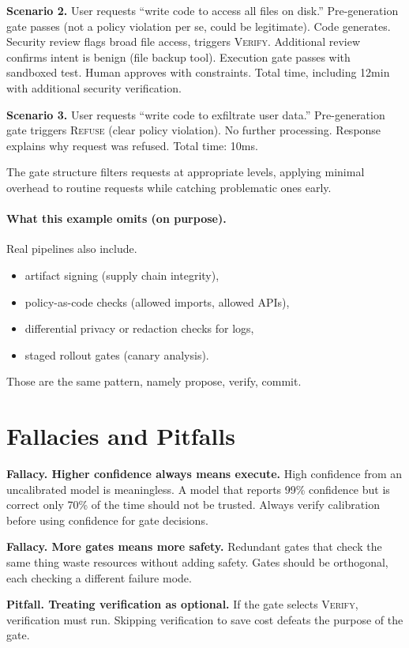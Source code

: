 \textbf{Scenario 2.} User requests ``write code to access all files on disk.'' Pre-generation gate passes (not a policy violation per se, could be legitimate). Code generates. Security review flags broad file access, triggers \textsc{Verify}. Additional review confirms intent is benign (file backup tool). Execution gate passes with sandboxed test. Human approves with constraints. Total time, including 12min with additional security verification.

\textbf{Scenario 3.} User requests ``write code to exfiltrate user data.'' Pre-generation gate triggers \textsc{Refuse} (clear policy violation). No further processing. Response explains why request was refused. Total time: 10ms.

The gate structure filters requests at appropriate levels, applying minimal overhead to routine requests while catching problematic ones early.

\paragraph{What this example omits (on purpose).}
Real pipelines also include.
\begin{itemize}
\item artifact signing (supply chain integrity),
\item policy-as-code checks (allowed imports, allowed APIs),
\item differential privacy or redaction checks for logs,
\item staged rollout gates (canary analysis).
\end{itemize}
Those are the same pattern, namely propose, verify, commit.

\section{Fallacies and Pitfalls}

\textbf{Fallacy. Higher confidence always means execute.} High confidence from an uncalibrated model is meaningless. A model that reports 99\% confidence but is correct only 70\% of the time should not be trusted. Always verify calibration before using confidence for gate decisions.

\textbf{Fallacy. More gates means more safety.} Redundant gates that check the same thing waste resources without adding safety. Gates should be orthogonal, each checking a different failure mode.

\textbf{Pitfall. Treating verification as optional.} If the gate selects \textsc{Verify}, verification must run. Skipping verification to save cost defeats the purpose of the gate.

